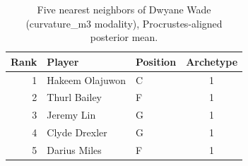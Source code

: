 \begin{table}[htbp]
  \centering\small
  \begin{tabular}{rllc}
    \toprule
    Rank & Player & Position & Archetype \\
    \midrule
    1 & Hakeem Olajuwon & C & 1 \\
    2 & Thurl Bailey & F & 1 \\
    3 & Jeremy Lin & G & 1 \\
    4 & Clyde Drexler & G & 1 \\
    5 & Darius Miles & F & 1 \\
    \bottomrule
  \end{tabular}
  \caption{Five nearest neighbors of Dwyane Wade (curvature_m3 modality), Procrustes-aligned posterior mean.}
  \label{tab:Dwyane_Wade_neighbors_curvature_m3}
\end{table}

